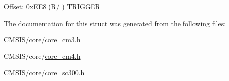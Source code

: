 Offset\+: 0x\+E\+E8 (R/ ) T\+R\+I\+G\+G\+ER 

The documentation for this struct was generated from the following files\+:\begin{DoxyCompactItemize}
\item 
C\+M\+S\+I\+S/core/\mbox{\hyperlink{core__cm3_8h}{core\+\_\+cm3.\+h}}\item 
C\+M\+S\+I\+S/core/\mbox{\hyperlink{core__cm4_8h}{core\+\_\+cm4.\+h}}\item 
C\+M\+S\+I\+S/core/\mbox{\hyperlink{core__sc300_8h}{core\+\_\+sc300.\+h}}\end{DoxyCompactItemize}
